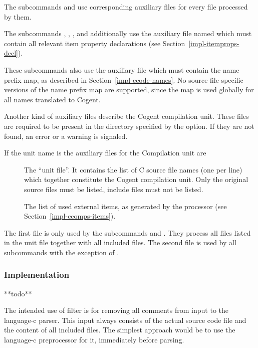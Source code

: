 The subcommands  and  use corresponding auxiliary files for every file  processed by them.

The subcommands , , , and  additionally use the auxiliary file named
 which must contain all relevant item property declarations (see Section~\ref{impl-itemprops-decl}).

These subcommands also use the auxiliary file  which must contain the name prefix map, 
as described in Section~\ref{impl-ccode-names}. No source file specific versions of the name prefix map are supported,
since the map is used globally for all names translated to Cogent.

Another kind of auxiliary files describe the Cogent compilation unit. These files are required to be present 
in the directory specified by the  option. If they are not found, an error or a warning is signaled.

If the unit name is  the auxiliary files for the Compilation unit are
\begin{description}
\item[] The ``unit file''. It contains the list of C source file names
(one per line) which together constitute the Cogent compilation unit. Only the original source files  must 
be listed, include files  must not be listed.
\item[] The list of used external items, as generated by the processor 
(see Section~\ref{impl-ccomps-items}).
\end{description}

The first file is only used by the subcommands  and . They process all files listed in the unit file
together with all included files. The second file is used by all  subcommands with the exception of .

\subsubsection{Implementation}

**todo**

The intended use of filter  is for removing all comments from input to the language-c parser.
This input always consists of the actual source code file and the content of all included files. The simplest approach
would be to use the language-c preprocessor for it, immediately before parsing. 

